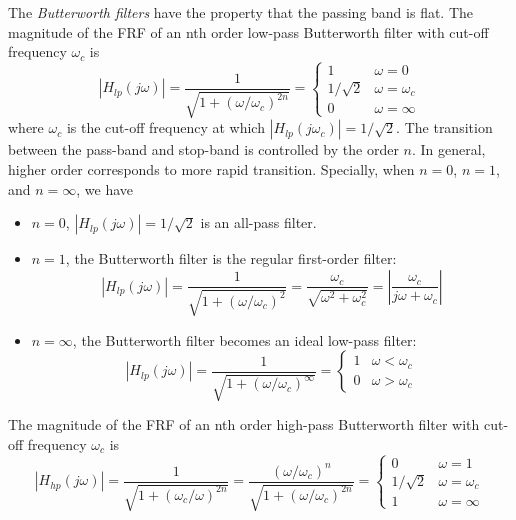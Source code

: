   The {\em Butterworth filters} have the property that the passing
  band is flat. The magnitude of the FRF of an nth order low-pass 
  Butterworth filter with cut-off frequency $\omega_c$ is
  \[
  \left| H_{lp}(j\omega)\right|=\frac{1}{\sqrt{1+(\omega/\omega_c)^{2n}}}
  =\left\{\begin{array}{ll}1 & \omega=0\\1/\sqrt{2}&\omega=\omega_c\\
  0 & \omega=\infty\end{array}\right.
  \]
  where $\omega_c$ is the cut-off frequency at which $|H_{lp}(j\omega_c)|
  =1/\sqrt{2}$.
  The transition between the pass-band and stop-band is controlled by the
  order $n$. In general, higher order corresponds to more rapid transition. 
  Specially, when $n=0$, $n=1$, and $n=\infty$, we have
  \begin{itemize}
  \item $n=0$, $|H_{lp}(j\omega)|=1/\sqrt{2}$ is an all-pass filter.
  \item $n=1$, the Butterworth filter is the regular first-order filter:
    \[
    |H_{lp}(j\omega)|=\frac{1}{\sqrt{1+(\omega/\omega_c)^2}}
    =\frac{\omega_c}{\sqrt{\omega^2+\omega_c^2}}
    =\left|\frac{\omega_c}{j\omega+\omega_c}\right|
    \]
  \item $n=\infty$, the Butterworth filter becomes an ideal low-pass
    filter:
    \[
    |H_{lp}(j\omega)|=\frac{1}{\sqrt{1+(\omega/\omega_c)^\infty}}  
    =\left\{\begin{array}{ll}1&\omega<\omega_c\\0&\omega>\omega_c\end{array}
    \right.
    \]
  \end{itemize}
  
  The magnitude of the FRF of an nth order high-pass Butterworth  filter 
  with cut-off frequency $\omega_c$ is
  \[
  \left| H_{hp}(j\omega)\right|=\frac{1}{\sqrt{1+(\omega_c/\omega)^{2n}}}
  =\frac{(\omega/\omega_c)^n}{\sqrt{1+(\omega/\omega_c)^{2n}}}
  =\left\{\begin{array}{ll}0 & \omega=1\\1/\sqrt{2}&\omega=\omega_c\\
  1 & \omega=\infty\end{array}\right.
  \]


